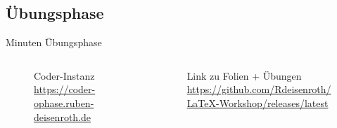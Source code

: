 \documentclass[
    ngerman,
    accentcolor=3b,
    dark_mode,
    fontsize= 12pt,
    a4paper,
    aspectratio=169,
    colorback=true,
    fancy_row_colors,
    leqno,
    fleqn,
    boxarc=3pt,
    fleqn,
]{algoslides}
\begin{document}

    \subsection{Übungsphase}
    \begin{frame}[c]
        \slidehead{}
         Minuten Übungsphase
        \begin{columns}[c]
            \begin{column}{.5\textwidth}
                \begin{figure}
                    \centering
                    \caption{Coder-Instanz\\\url{https://coder-ophase.ruben-deisenroth.de}}
                \end{figure}
            \end{column}%
            \begin{column}{.5\textwidth}
                \begin{figure}
                    \centering
                    \caption{Link zu Folien + Übungen\\\url{https://github.com/Rdeisenroth/LaTeX-Workshop/releases/latest}}
                \end{figure}
            \end{column}
        \end{columns}
    \end{frame}
\end{document}

